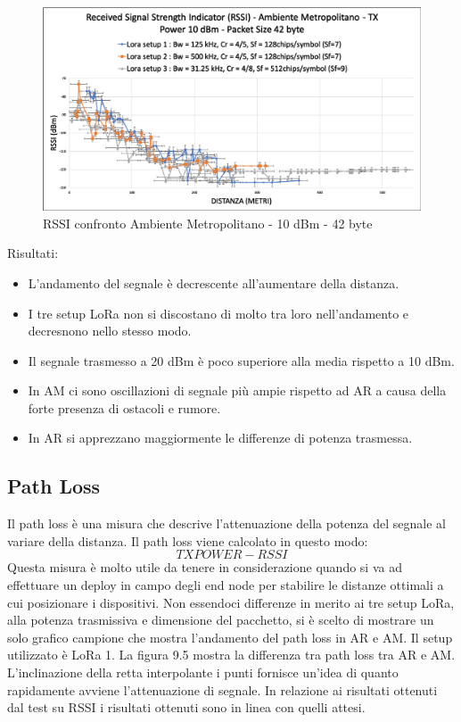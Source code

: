 \documentclass[12pt,a4paper,openright,twoside]{report}
\begin{document}
\begin{figure}[h]                      
\begin{center} 
\includegraphics[width=\textwidth]{RSSI_confronto_AM-10dBm-42byte.png}
\caption[RSSI confronto Ambiente Metropolitano - 10 dBm - 42 byte]{RSSI confronto Ambiente Metropolitano - 10 dBm - 42 byte}\label{fig:prima}
\end{center}
\end{figure}

Risultati:
\begin{itemize}    
\item L'andamento del segnale \`e decrescente all'aumentare della distanza.
\item I tre setup LoRa non si discostano di molto tra loro nell'andamento e decresnono nello stesso modo.  
\item Il segnale trasmesso a 20 dBm \`e poco superiore alla media rispetto a 10 dBm. 
\item In AM ci sono oscillazioni di segnale pi\`u ampie rispetto ad AR a causa della forte presenza di ostacoli e rumore.
\item In AR si apprezzano maggiormente le differenze di potenza trasmessa. 
\end{itemize}

\subsection{Path Loss}
Il path loss \`e una misura che descrive l'attenuazione della potenza del segnale al variare della distanza. Il path loss viene calcolato in questo modo:
\begin{equation} TX POWER - RSSI \end{equation}
Questa misura \`e molto utile da tenere in considerazione quando si va ad effettuare un deploy in campo degli end node per stabilire le distanze ottimali a cui posizionare i dispositivi. Non essendoci differenze in merito ai tre setup LoRa, alla potenza trasmissiva e dimensione del pacchetto, si \`e scelto di mostrare un solo grafico campione che mostra l'andamento del path loss in AR e AM. Il setup utilizzato \`e LoRa 1. La figura 9.5 mostra la differenza tra path loss tra AR e AM. L'inclinazione della retta interpolante i punti fornisce un'idea di quanto rapidamente avviene l'attenuazione di segnale. In relazione ai risultati ottenuti dal test su RSSI i risultati ottenuti sono in linea con quelli attesi.
\end{document}
